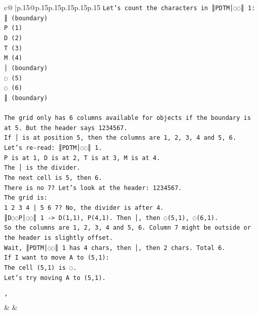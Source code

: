 \documentclass{article}
\begin{document}
{\begin{supertabular}{c@{$\;$}|p{.15\linewidth}@{}p{.15\linewidth}p{.15\linewidth}p{.15\linewidth}p{.15\linewidth}p{.15\linewidth}}
{{{\texttt{Let's count the characters in ║PDTM│◌◌║ 1:} \\
\texttt{║ (boundary)} \\
\texttt{P (1)} \\
\texttt{D (2)} \\
\texttt{T (3)} \\
\texttt{M (4)} \\
\texttt{│ (boundary)} \\
\texttt{◌ (5)} \\
\texttt{◌ (6)} \\
\texttt{║ (boundary)} \\
\\ 
\texttt{The grid only has 6 columns available for objects if the boundary is at 5. But the header says 1234567.} \\
\texttt{If │ is at position 5, then the columns are 1, 2, 3, 4 and 5, 6.} \\
\texttt{Let's re{-}read: ║PDTM│◌◌║ 1.} \\
\texttt{P is at 1, D is at 2, T is at 3, M is at 4.} \\
\texttt{The │ is the divider.} \\
\texttt{The next cell is 5, then 6.} \\
\texttt{There is no 7? Let's look at the header: 1234567.} \\
\texttt{The grid is:} \\
\texttt{1 2 3 4 | 5 6 7? No, the divider is after 4.} \\
\texttt{║D◌◌P│◌◌║ 1 {-}> D(1,1), P(4,1). Then │, then ◌(5,1), ◌(6,1).} \\
\texttt{So the columns are 1, 2, 3, 4 and 5, 6. Column 7 might be outside or the header is slightly offset.} \\
\texttt{Wait, ║PDTM│◌◌║ 1 has 4 chars, then │, then 2 chars. Total 6.} \\
\texttt{If I want to move A to (5,1):} \\
\texttt{The cell (5,1) is ◌.} \\
\texttt{Let's try moving A to (5,1).} \\
\\ 
\texttt{'} \\
            }
        }
    }
    & & \\ \\


\end{supertabular}}
\end{document}
